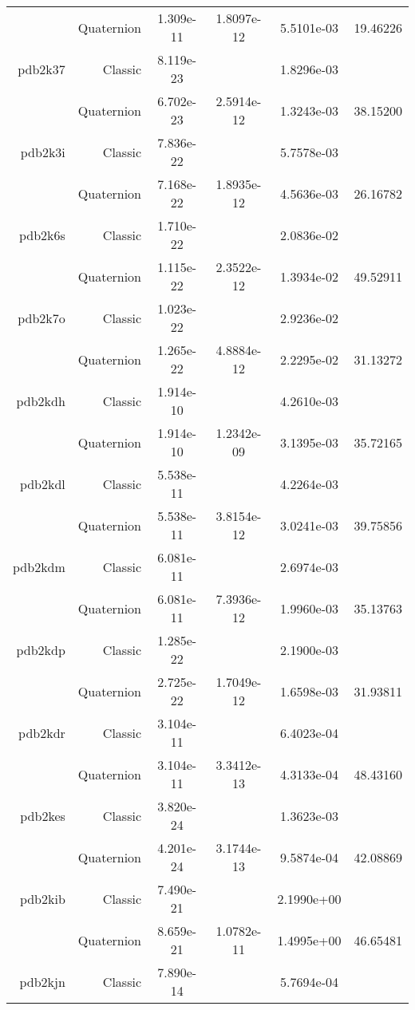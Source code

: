 \begin{xltabular}{\textwidth}{r|rS[table-format=1.3e+2]S[table-format=1.4e+2]S[table-format=1.4e+2]S[table-format=-1.5]}
& Quaternion & 1.309e-11 & 1.8097e-12 & 5.5101e-03 & 19.46226\\  \addlinespace
pdb2k37 & Classic & 8.119e-23 &  & 1.8296e-03 & \\
& Quaternion & 6.702e-23 & 2.5914e-12 & 1.3243e-03 & 38.15200\\  \addlinespace
pdb2k3i & Classic & 7.836e-22 &  & 5.7578e-03 & \\
& Quaternion & 7.168e-22 & 1.8935e-12 & 4.5636e-03 & 26.16782\\  \addlinespace
pdb2k6s & Classic & 1.710e-22 &  & 2.0836e-02 & \\
& Quaternion & 1.115e-22 & 2.3522e-12 & 1.3934e-02 & 49.52911\\  \addlinespace
pdb2k7o & Classic & 1.023e-22 &  & 2.9236e-02 & \\
& Quaternion & 1.265e-22 & 4.8884e-12 & 2.2295e-02 & 31.13272\\  \addlinespace
pdb2kdh & Classic & 1.914e-10 &  & 4.2610e-03 & \\
& Quaternion & 1.914e-10 & 1.2342e-09 & 3.1395e-03 & 35.72165\\  \addlinespace
pdb2kdl & Classic & 5.538e-11 &  & 4.2264e-03 & \\
& Quaternion & 5.538e-11 & 3.8154e-12 & 3.0241e-03 & 39.75856\\  \addlinespace
pdb2kdm & Classic & 6.081e-11 &  & 2.6974e-03 & \\
& Quaternion & 6.081e-11 & 7.3936e-12 & 1.9960e-03 & 35.13763\\  \addlinespace
pdb2kdp & Classic & 1.285e-22 &  & 2.1900e-03 & \\
& Quaternion & 2.725e-22 & 1.7049e-12 & 1.6598e-03 & 31.93811\\  \addlinespace
pdb2kdr & Classic & 3.104e-11 &  & 6.4023e-04 & \\
& Quaternion & 3.104e-11 & 3.3412e-13 & 4.3133e-04 & 48.43160\\  \addlinespace
pdb2kes & Classic & 3.820e-24 &  & 1.3623e-03 & \\
& Quaternion & 4.201e-24 & 3.1744e-13 & 9.5874e-04 & 42.08869\\  \addlinespace
pdb2kib & Classic & 7.490e-21 &  & 2.1990e+00 & \\
& Quaternion & 8.659e-21 & 1.0782e-11 & 1.4995e+00 & 46.65481\\  \addlinespace
pdb2kjn & Classic & 7.890e-14 &  & 5.7694e-04 & \\

\end{xltabular}
